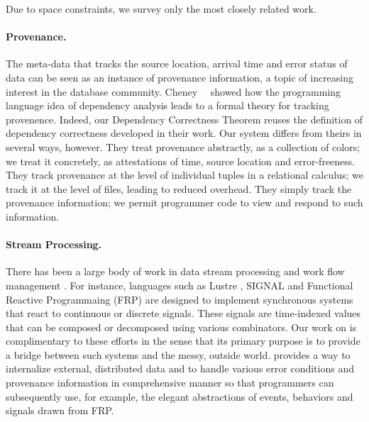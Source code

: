 
Due to space constraints, we survey only the most closely related work.

\paragraph*{Provenance.}  The \padsd{} meta-data that tracks the
source location, arrival time and error status of data can be seen as
an instance of provenance information, a topic of increasing interest
in the database community.  Cheney~\etal{}~\cite{cheney-dbpl07} showed
how the programming language idea of dependency analysis leads to a
formal theory for tracking provenence.  Indeed, our Dependency
Correctness Theorem reuses the definition of dependency correctness
developed in their work.  Our system differs from theirs in several
ways, however.  They treat provenance abstractly, as a collection of
colors; we treat it concretely, as attestations of time, source
location and error-freeness.  They track provenance at the level of
individual tuples in a relational calculus; we track it at the level
of files, leading to reduced overhead.  They simply track the
provenance information; we permit programmer code to view and
respond to such information.

\paragraph*{Stream Processing.}
There has been a large body of work in data stream processing and work
flow management \cite{Golab03}. For instance, languages such as Lustre
\cite{CaspiPHP87}, SIGNAL \cite{AmagbegnonBG95} and Functional
Reactive Programmaing (FRP) \cite{ElliottH97,WanH00} are designed to
implement synchronous systems that react to continuous or discrete
signals. These signals are time-indexed values that can be composed or
decomposed using various combinators.  Our work on \padsd{} is
complimentary to these efforts in the sense that its primary purpose
is to provide a bridge between such systems and the messy, outside
world.  \padsd{} provides a way to internalize external, distributed
data and to handle various error conditions and provenance information
in comprehensive manner so that programmers can subsequently use, for
example, the elegant abstractions of events, behaviors and signals
drawn from FRP.


